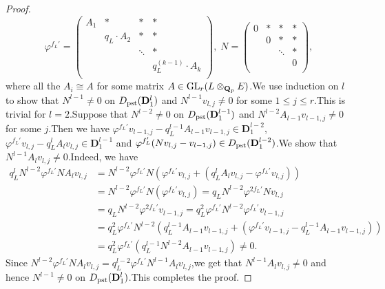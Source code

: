 \documentclass[SecEq,CM,GP]{degruyter-crelle} %
\theoremstyle{plain}
\newcommand{\Dpik}{{\mathbf{D}}}
\newcommand{\GLN}{{\rm GL}}
\newcommand{\pst}{{\rm pst}}
\newcommand{\bQ}{{\mathbf{Q}}}
\begin{document}
\begin{proof}
\[\varphi^{f_L'}=\left(
\begin{array}{cccc}
	A_1 & \ast & \ast & \ast \\
	& q_L\cdot A_2 & \ast & \ast \\
	&  & \ddots & \ast \\
	&  &  & q_L^{(k-1)}\cdot A_k \\
\end{array}
\right),\;
N=\left(
\begin{array}{cccc}
	0 & \ast  & \ast & \ast  \\
	& 0 & \ast &  \ast \\
	&  & \ddots & \ast  \\
	&  &  & 0 \\
\end{array}
\right),
\]
where all the $A_i\cong A$ for some matrix $A\in\GLN_r(L\otimes_{\bQ_p}E)$.\;We use induction on $l$ to show that $N^{l-1}\neq 0$ on $D_{\pst}(\Dpik^{l}_{1})$ and $N^{l-1}v_{l,j}\neq 0$ for some  $1\leq j\leq r$.\;This is trivial for $l=2$.\;Suppose that $N^{l-2}\neq 0$ on $D_{\pst}(\Dpik^{l-1}_{1})$ and $N^{l-2}A_{l-1}v_{l-1,j}\neq 0$ for some  $j$.\;Then we have $\varphi^{f_L'}v_{l-1,j}-q_L^{l-1}A_{l-1}v_{l-1,j}\in \Dpik^{l-2}_{1}$, $\varphi^{f_L'}v_{l,j}-q_L^{l}A_{l}v_{l,j}\in \Dpik^{l-1}_{1}$ and 
$\varphi^{f_L'}(Nv_{l,j}-v_{l-1,j})\in D_{\pst}(\Dpik^{l-2}_{1})$.\;We show that $N^{l-1}A_{l}v_{l,j}\neq 0$.\;Indeed, we have
\begin{equation}
\begin{aligned}
	q_L^{l}N^{l-2}\varphi^{f_L'}NA_lv_{l,j}&=N^{l-2}\varphi^{f_L'}N(\varphi^{f_L'}v_{l,j}+(q_L^{l}A_{l}v_{l,j}-\varphi^{f_L'}v_{l,j}))\\
	&=N^{l-2}\varphi^{f_L'}N(\varphi^{f_L'}v_{l,j})=q_LN^{l-2}\varphi^{2f_L'}Nv_{l,j}\\
	&=q_LN^{l-2}\varphi^{2f_L'}v_{l-1,j}=q_L^2\varphi^{f_L'}N^{l-2}\varphi^{f_L'}v_{l-1,j}\\
	&=q_L^2\varphi^{f_L'}N^{l-2}(q_L^{l-1}A_{l-1}v_{l-1,j}+(\varphi^{f_L'}v_{l-1,j}-q_L^{l-1}A_{l-1}v_{l-1,j}))\\
	&=q_L^2\varphi^{f_L'}(q_L^{l-1}N^{l-2}A_{l-1}v_{l-1,j})\neq 0.
\end{aligned}
\end{equation}
Since $N^{l-2}\varphi^{f_L'}NA_lv_{l,j}=q_L^{l-2}\varphi^{f_L'}N^{l-1}A_lv_{l,j}$,\;we get that $N^{l-1}A_lv_{l,j}\neq 0$ and hence $N^{l-1}\neq 0$ on $D_{\pst}(\Dpik^{l}_{1})$.\;This completes the proof.\;
\end{proof}
\end{document}
